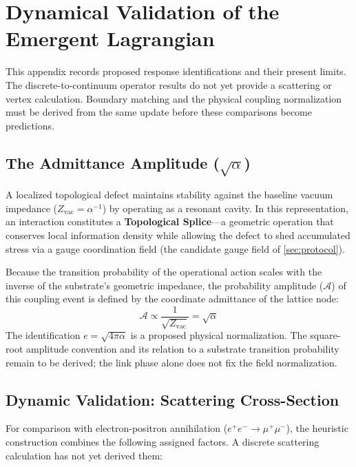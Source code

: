 \section{Dynamical Validation of the Emergent Lagrangian}
\label{app:impedance_power_transfer}

This appendix records proposed response identifications and their present limits. The discrete-to-continuum operator results do not yet provide a scattering or vertex calculation. Boundary matching and the physical coupling normalization must be derived from the same update before these comparisons become predictions.

\subsection{The Admittance Amplitude (\texorpdfstring{$\sqrt{\alpha}$}{sqrt alpha})}

A localized topological defect maintains stability against the baseline vacuum impedance ($Z_{\text{vac}} = \alpha^{-1}$) by operating as a resonant cavity. In this representation, an interaction constitutes a \textbf{Topological Splice}—a geometric operation that conserves local information density while allowing the defect to shed accumulated stress via a gauge coordination field (the candidate gauge field of \cref{sec:protocol}).

Because the transition probability of the operational action scales with the inverse of the substrate's geometric impedance, the probability amplitude ($\mathcal{A}$) of this coupling event is defined by the coordinate admittance of the lattice node:
\begin{equation}
\mathcal{A} \propto \frac{1}{\sqrt{Z_{\text{vac}}}} = \sqrt{\alpha}
\end{equation}
The identification $e=\sqrt{4\pi\alpha}$ is a proposed physical normalization. The square-root amplitude convention and its relation to a substrate transition probability remain to be derived; the link phase alone does not fix the field normalization.

\subsection{Dynamic Validation: Scattering Cross-Section}

For comparison with electron-positron annihilation ($e^+e^- \to \mu^+\mu^-$), the heuristic construction combines the following assigned factors. A discrete scattering calculation has not yet derived them:

